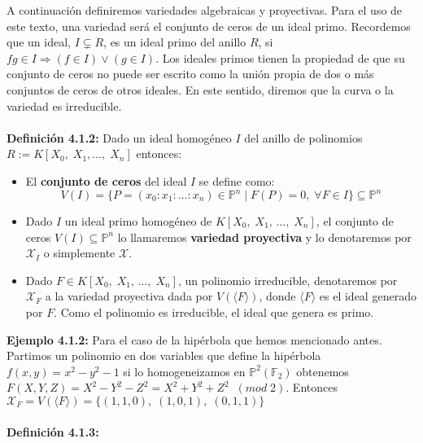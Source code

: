 \documentclass[11pt,spanish]{book}
\begin{document}
A continuación definiremos variedades algebraicas y proyectivas. Para el uso de este texto, una variedad será el conjunto de ceros de un ideal primo. Recordemos que un ideal, $I\subsetneq R$, es un ideal primo del anillo $R$, si $fg\in I\Rightarrow (f\in I)\lor (g\in I) $. Los ideales primos tienen la propiedad de que su conjunto de ceros no puede ser escrito como la unión propia de dos o más conjuntos de ceros de otros ideales. En este sentido, diremos que la curva o la variedad es irreducible.\\
\\ \textbf{Definición 4.1.2:} Dado un ideal homogéneo $I$ del anillo de polinomios $R:=K[X_0,\;X_1,\ldots,\;X_n]$ entonces:
\begin{itemize}
    \item El \textbf{conjunto de ceros} del ideal $I$ se define como:
     $$V(I)=\{P=(x_0:x_1:\ldots:x_n)\in \mathbb{P}^{n}\;|\; F(P)=0,\;\forall F\in I\}\subseteq \mathbb{P}^{n}$$
     \item Dado $I$ un ideal primo homogéneo de $K[X_0,\;X_1,\,\ldots,\;X_n]$, el conjunto de ceros $V(I)\subseteq \mathbb{P}^{n}$ lo llamaremos \textbf{variedad proyectiva} y lo denotaremos por $\mathbf{\mathcal{X}}_{I}$ o simplemente $\mathbf{\mathcal{X}}$.
     \item Dado $F\in K[X_0,\;X_1,\,\ldots,\;X_n]$, un polinomio irreducible, denotaremos por $\mathbf{\mathcal{X}}_{F}$ a la variedad proyectiva dada por $V(\langle F \rangle)$, donde $\langle F \rangle$ es el ideal generado por $F$. Como el polinomio es irreducible, el ideal que genera es primo. 
\end{itemize}
\textbf{Ejemplo 4.1.2: } Para el caso de la hipérbola que hemos mencionado antes. Partimos un polinomio en dos variables que define la hipérbola $f(x,y)=x^{2}-y^{2}-1$ si lo homogeneizamos en $\mathbb{P}^{2}(\mathbb{F}_{2})$ obtenemos $F(X,Y,Z) = X^{2} - Y^{2} - Z^{2} = X^{2} + Y^{2} + Z^{2}\;\;(mod\;2)$. Entonces $\mathcal{X}_{F}=V(\langle F\rangle)=\{(1,1,0),\;(1,0,1),\;(0,1,1)\}$\\
\\\textbf{Definición 4.1.3: } 
\end{document}
